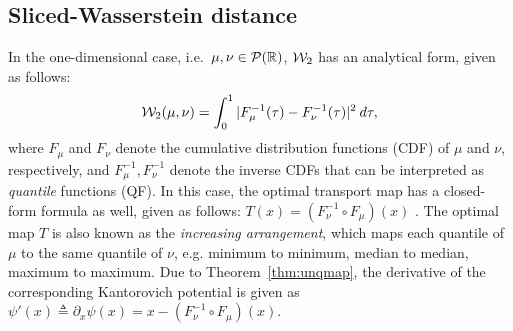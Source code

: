 




\subsection{Sliced-Wasserstein distance}
\label{sec:sw}

In the one-dimensional case, i.e.\ $\mu,\nu \in {\cal P}(\mathbb{R})$, ${\cal W}_2$ has an analytical form, given as follows:
\begin{align}
{\cal W}_2(\mu,\nu) = \int_0^1 |F_\mu^{-1}(\tau) - F_\nu^{-1}(\tau)|^2 \> d\tau,
\end{align}
where $F_\mu$ and $F_\nu$ denote the cumulative distribution functions (CDF) of $\mu$ and $\nu$, respectively, and $F^{-1}_\mu, F^{-1}_\nu$ denote the inverse CDFs that can be interpreted as \emph{quantile} functions (QF).
%
In this case, the optimal transport map has a closed-form formula as well, given as follows: $T(x) = (F_\nu^{-1} \circ F_\mu) (x)$ . The optimal map $T$ is also known as the \emph{increasing arrangement}, which maps each quantile of $\mu$ to the same quantile of $\nu$, e.g. minimum to minimum, median to median, maximum to maximum.
%
Due to Theorem~\ref{thm:unqmap}, the derivative of the corresponding Kantorovich potential is given as $\psi'(x) \triangleq \partial_x \psi(x) = x- (F_\nu^{-1} \circ F_\mu) (x)$.

